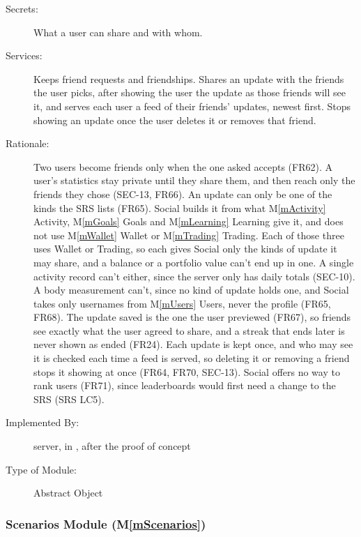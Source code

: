 \documentclass[12pt, titlepage]{article}
\newcommand{\mref}[1]{M\ref{#1}}
\begin{document}
\begin{description}
\item[Secrets:] What a user can share and with whom.
\item[Services:] Keeps friend requests and friendships. Shares an update with the friends the user picks, after showing the user the update as those friends will see it, and serves each user a feed of their friends' updates, newest first. Stops showing an update once the user deletes it or removes that friend.
\item[Rationale:] Two users become friends only when the one asked accepts (FR62). A user's statistics stay private until they share them, and then reach only the friends they chose (SEC-13, FR66). An update can only be one of the kinds the SRS lists (FR65). Social builds it from what \mref{mActivity} Activity, \mref{mGoals} Goals and \mref{mLearning} Learning give it, and does not use \mref{mWallet} Wallet or \mref{mTrading} Trading. Each of those three uses Wallet or Trading, so each gives Social only the kinds of update it may share, and a balance or a portfolio value can't end up in one. A single activity record can't either, since the server only has daily totals (SEC-10). A body measurement can't, since no kind of update holds one, and Social takes only usernames from \mref{mUsers} Users, never the profile (FR65, FR68). The update saved is the one the user previewed (FR67), so friends see exactly what the user agreed to share, and a streak that ends later is never shown as ended (FR24). Each update is kept once, and who may see it is checked each time a feed is served, so deleting it or removing a friend stops it showing at once (FR64, FR70, SEC-13). Social offers no way to rank users (FR71), since leaderboards would first need a change to the SRS (SRS LC5).
\item[Implemented By:] \progname{} server, in , after the proof of concept
\item[Type of Module:] Abstract Object
\end{description}

\subsubsection{Scenarios Module (\mref{mScenarios})}
\end{document}
